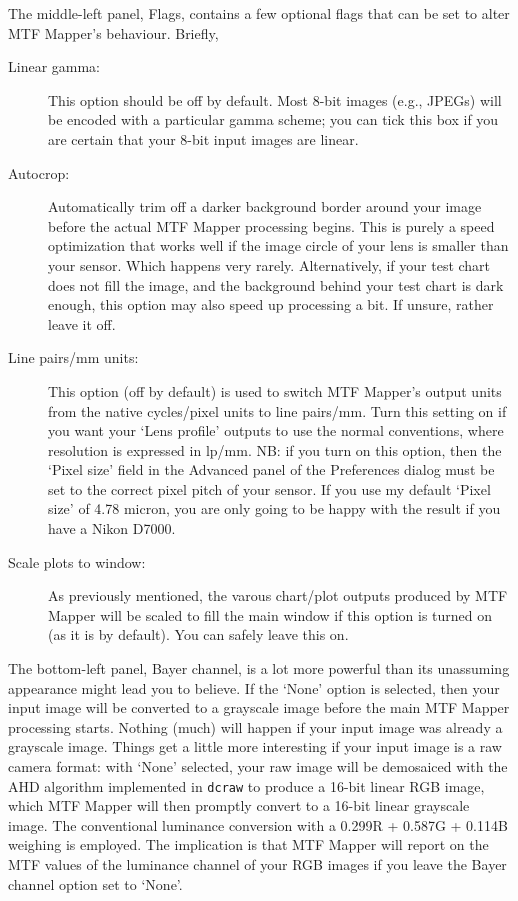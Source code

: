 \documentclass[a4paper]{article}
\begin{document}
The middle-left panel, \textsf{Flags}, contains a few optional flags that
can be set to alter MTF Mapper's behaviour. Briefly,
\begin{description}
\item[Linear gamma:] This option should be off by default. Most 8-bit images
(e.g., JPEGs) will be encoded with a particular gamma scheme; you can tick
this box if you are certain that your 8-bit input images are linear.
\item[Autocrop:] Automatically trim off a darker background border around your image
before the actual MTF Mapper processing begins. This is purely a speed
optimization that works well if the image circle of your lens is smaller
than your sensor. Which happens very rarely. Alternatively, if your test
chart does not fill the image, and the background behind your test chart is
dark enough, this option may also speed up processing a bit. If unsure,
rather leave it off.
\item[Line pairs/mm units:] This option (off by default) is used to switch
MTF Mapper's output units from the native cycles/pixel units to line
pairs/mm. Turn this setting on if you want your `Lens profile'
outputs to use the normal conventions, where resolution is expressed in
lp/mm. NB: if you turn on this option, then the `Pixel size' field in the
\textsf{Advanced} panel of the \textsf{Preferences} dialog must be set to
the correct pixel pitch of your sensor. If you use my default `Pixel size'
of 4.78 micron, you are only going to be happy with the result if you have a
Nikon D7000.
\item[Scale plots to window:] As previously mentioned, the varous
chart/plot outputs produced by MTF Mapper will be scaled to fill the main
window if this option is turned on (as it is by default). You can safely
leave this on.
\end{description}

The bottom-left panel, \textsf{Bayer channel}, is a lot more powerful than
its unassuming appearance might lead you to believe. If the `None' option is
selected, then your input image will be converted to a grayscale image
before the main MTF Mapper processing starts. Nothing (much) will happen if
your input image was already a grayscale image. Things get a little more
interesting if your input image is a raw camera format: with `None'
selected, your raw image will be demosaiced with the AHD algorithm
implemented in \texttt{dcraw} to produce a 16-bit linear RGB image, which
MTF Mapper will then promptly convert to a 16-bit linear grayscale image.
The conventional luminance conversion with a 0.299R + 0.587G + 0.114B weighing is
employed. The implication is that MTF Mapper will report on the MTF values
of the luminance channel of your RGB images if you leave the \textsf{Bayer
channel} option set to `None'.
\end{document}
